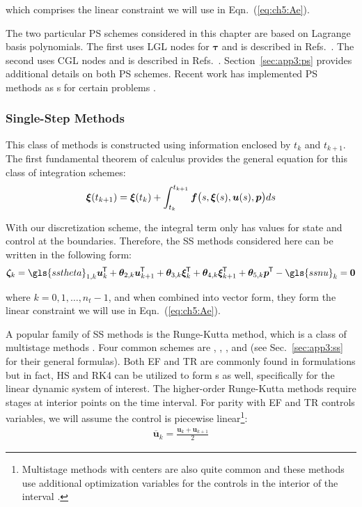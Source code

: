 \noindent which comprises the linear constraint we will use in Eqn.~(\ref{eq:ch5:Ae}).

The two particular PS schemes considered in this chapter are based on Lagrange basis polynomials.
The first uses LGL nodes for $\bm{\tau}$ and is described in Refs.~\cite{Fahroo2008a, Becerra2010b, Herber2015a}.
The second uses CGL nodes and is described in Refs.~\cite{Fahroo2002a, Fahroo2008a, Herber2015a}.
Section~\ref{sec:app3:ps} provides additional details on both PS schemes.
Recent work has implemented PS methods as {\qp}s for certain \lqdo{} problems \cite{Williams2004a}.

\subsubsection{Single-Step Methods\label{sec:ch5:ss}}

This class of methods is constructed using information enclosed by $t_{k}$ and $t_{k+1}$.
The first fundamental theorem of calculus provides the general equation for this class of integration schemes:
\begin{align} \label{eq:ch5:ssintegral}
\bm{\xi}(t_{k+1}) = \bm{\xi}(t_{k}) + \int_{t_k}^{t_{k+1}} \bm{f}\big(s,\bm{\xi}(s),\bm{u}(s), \bm{p} \big) ds
\end{align}

\noindent With our discretization scheme, the integral term only has values for state and control at the boundaries. Therefore, the SS methods considered here can be written in the following form:
\begin{align} \label{eq:ch5:ss}
\bm{\zeta}_k =
\gls{sstheta}_{1,k} \bm{u}_k\tran + \bm{\theta}_{2,k} \bm{u}_{k+1}\tran +
\bm{\theta}_{3,k} \bm{\xi}_k\tran + \bm{\theta}_{4,k} \bm{\xi}_{k+1}\tran + 
\bm{\theta}_{5,k} \bp\tran
- \gls{ssnu}_k = \bm{0}
\end{align}

\noindent where $k = 0,1,\dots, n_t - 1$, and when combined into vector form, they form the linear constraint we will use in Eqn.~(\ref{eq:ch5:Ae}). 

A popular family of SS methods is the Runge-Kutta method, which is a class of multistage methods \cite{Betts2010a}.
Four common schemes are , , , and  (see Sec.~\ref{sec:app3:ss} for their general formulas).
Both EF and TR are commonly found in \qp{} formulations \cite{Herber2014a, Betts2010a, Biegler2010a} but in fact, HS and RK4 can be utilized to form {\qp}s as well, specifically for the linear dynamic system of interest.
The higher-order Runge-Kutta methods require stages at interior points on the time interval.
For parity with EF and TR controls variables, we will assume the control is piecewise linear\footnote{Multistage methods with centers are also quite common and these methods use additional optimization variables for the controls in the interior of the interval \cite{Betts1998b, Williams2005a}.}:
\begin{align} \label{eq:ch5:upiece}
\overbar{\bm{u}}_k = \frac{\bm{u}_{k} + \bm{u}_{k+1}}{2}
\end{align}

